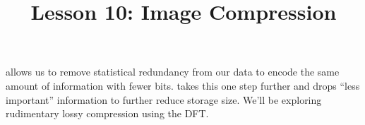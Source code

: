 \documentclass{article}
\title{Lesson 10: Image Compression}
\begin{document}
\renderTitle

 allows us to remove statistical redundancy from our
data to encode the same amount of information with fewer bits.
 takes this one step further and drops
\enquote{less important} information to further reduce storage size.
We'll be exploring rudimentary lossy compression using the DFT.
\end{document}
